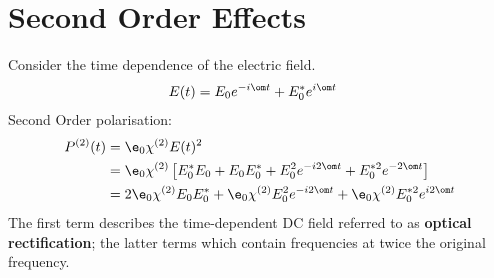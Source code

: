 \documentclass[a4paper, 11pt, normalem]{report}
\begin{document}
\section{Second Order Effects}
\begin{figure}[H]
    \centering
\end{figure}
Consider the time dependence of the electric field.
\begin{align}
    E(t) &= E_0e^{-i\om t} + E_0^*e^{i\om t}
\end{align}
Second Order polarisation:
\begin{align}
    P^{(2)}(t) &= \e_0\chi^{(2)}E(t)^2 \\
               &= \e_0\chi^{(2)}\left[E_0^*E_0 + E_0E_0^* + E_0^2e^{-i2\om t} + E_0^{*2}e^{-2\om t}\right] \\
               &= 2\e_0\chi^{(2)}E_0E_0^* + \e_0\chi^{(2)}E_0^2e^{-i2\om t} + \e_0\chi^{(2)}E_0^{*2}e^{i2\om t}
\end{align}
The first term describes the time-dependent DC field referred to as \textbf{optical rectification}; the latter terms which contain frequencies at twice the original frequency.
\end{document}
